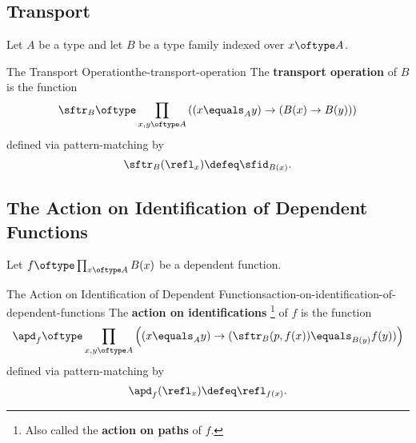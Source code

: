 \subsection{Transport}\label{subsection-martin-löf-type-theory-transport}
Let $A$ be a type and let $B$ be a type family indexed over $x\oftype A$.
\begin{definition}{The Transport Operation}{the-transport-operation}%
    The \textbf{transport operation} of $B$ is the function
    \[
        \sftr_{B}%
        \oftype%
        \prod_{x,y\oftype A}%
        \left(%
            (x\equals_{A}y)%
            \to%
            (B(x)\to B(y))%
        \right)%
    \]%
    defined via pattern-matching by
    \[
        \sftr_{B}(\refl_{x})%
        \defeq%
        \sfid_{B(x)}.%
    \]
\end{definition}
\subsection{The Action on Identification of Dependent Functions}\label{the-action-on-identification-of-dependent-functions}
Let $f\oftype\prod_{x\oftype A}B(x)$ be a dependent function.
\begin{definition}{The Action on Identification of Dependent Functions}{action-on-identification-of-dependent-functions}%
    The \textbf{action on identifications}%
    \footnote{%
        Also called the \textbf{action on paths} of $f$.
        \par\vspace*{\TCBBoxCorrection}
    } %
    of $f$ is the function
    \[
        \apd_{f}%
        \oftype%
        \prod_{x,y\oftype A}\left((x\equals_{A}y)\to(\sftr_{B}(p,f(x))\equals_{B(y)}f(y))\right)%
    \]%
    defined via pattern-matching by
    \[
        \apd_{f}(\refl_{x})%
        \defeq%
        \refl_{f(x)}.%
    \]%
\end{definition}
\begin{appendices}

\end{appendices}

